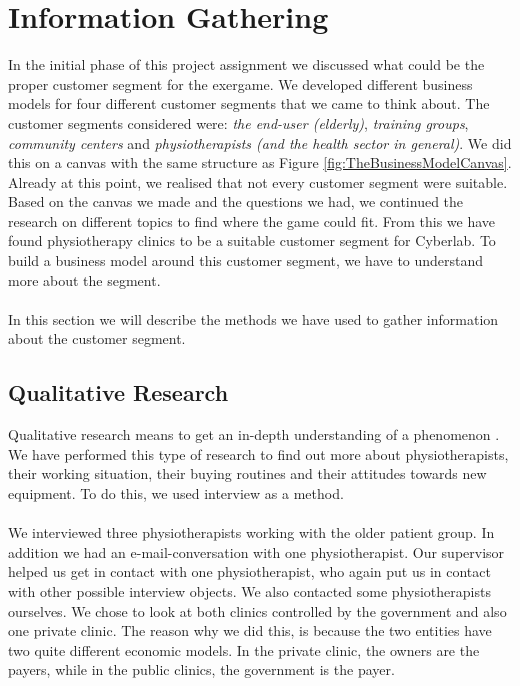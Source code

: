 \chapter{Information Gathering}
In the initial phase of this project assignment we discussed what could be the proper customer segment for the exergame. We developed different business models for four different customer segments that we came to think about. The customer segments considered were: \emph{the end-user (elderly)}, \emph{training groups}, \emph{community centers} and \emph{physiotherapists (and the health sector in general)}.  We did this on a canvas with the same structure as Figure  \ref{fig:TheBusinessModelCanvas}. Already at this point, we realised that not every customer segment were suitable. Based on the canvas we made and the questions we had, we continued the research on different topics to find where the game could fit. From this we have found physiotherapy clinics to be a suitable customer segment for Cyberlab. To build a business model around this customer segment, we have to understand more about the segment. \\ \\
In this section we will describe the methods we have used to gather information about the customer segment.

\section{Qualitative Research}
Qualitative research means to get an in-depth understanding of a phenomenon \cite{interview2}. We have performed this type of research to find out more about physiotherapists, their working situation, their buying routines and their attitudes towards new equipment. To do this, we used interview as a method. \\ \\
We interviewed three physiotherapists working with the older patient group. In addition we had an e-mail-conversation with one physiotherapist. Our supervisor helped us get in contact with one physiotherapist, who again put us in contact with other possible interview objects. We also contacted some physiotherapists ourselves. We chose to look at both clinics controlled by the government and also one private clinic. The reason why we did this, is because the two entities have two quite different economic models. In the private clinic, the owners are the payers, while in the public clinics, the government is the payer.

